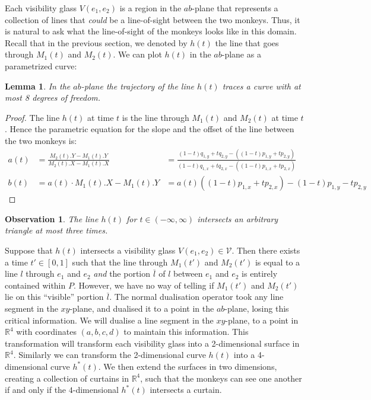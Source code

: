 \documentclass{article}
\newtheorem{observation}{Observation}
\newtheorem{lemma}{Lemma}
\begin{document}
Each visibility glass $V(e_1, e_2)$ is a region in the $ab$-plane that represents a collection of lines that \emph{could} be a line-of-sight between the two monkeys. Thus, it is natural to ask what the line-of-sight of the monkeys looks like in this domain. Recall that in the previous section, we denoted by $h(t)$ the line that goes through $M_1(t)$ and $M_2(t)$. We can plot $h(t)$ in the $ab$-plane as a parametrized curve:

\begin{lemma}
In the $ab$-plane the trajectory of the line $h(t)$ traces a curve with at most 8 degrees of freedom.
\end{lemma}

\begin{proof}
  The line $h(t)$ at time $t$ is the line through $M_1(t)$ and $M_2(t)$ at time $t$. Hence the parametric equation for the slope and the offset of the line between the two monkeys is:
  \begin{align*}
      a(t) &= \frac{M_2(t).Y - M_1(t).Y}{M_2(t).X - M_1(t).X} &= \frac{ (1-t)q_{1,y} + t q_{2,y} - ((1-t)p_{1,y} + t p_{2,y} ) }
      {(1-t)q_{1,x} + t q_{2,x} - ((1-t)p_{1,x} + t p_{2,x} )} \\
      b(t) &= a(t)\cdot M_1(t).X - M_1(t).Y &= a(t)((1-t)p_{1,x} + t p_{2,x}) - (1-t)p_{1,y} - t p_{2,y} 
  \end{align*}
\end{proof}

\begin{observation}
\label{observation:intersection}
  The line $h(t)$ for $t \in (-\infty, \infty)$ intersects an arbitrary triangle at most three times.
\end{observation}

Suppose that $h(t)$ intersects a visibility glass $V(e_1, e_2) \in \mathcal{V}$. Then there exists a time $t' \in [0, 1]$ such that the line through $M_1(t')$ and $M_2(t')$ is equal to a line $l$ through $e_1$ and $e_2$ \emph{and} the portion $\overline{l}$ of $l$ between $e_1$ and $e_2$ is entirely contained within $P$. However, we have no way of telling if $M_1(t')$ and $M_2(t')$ lie on this ``visible'' portion $\overline{l}$. The normal dualisation operator took any line segment in the $xy$-plane, and dualised it to a point in the $ab$-plane, losing this critical information. We will dualise a line segment in the $xy$-plane, to a point in $\mathbb{R}^4$ with coordinates $(a,b,c, d)$ to maintain this information. This transformation will transform each visibility glass into a 2-dimensional surface in $\mathbb{R}^4$. Similarly we can transform the 2-dimensional curve $h(t)$ into a 4-dimensional curve $h^*(t)$. We then extend the surfaces in two dimensions, creating a collection of curtains in $\mathbb{R}^4$, such that the monkeys can see one another if and only if the $4$-dimensional $h^*(t)$ intersects a curtain.
\end{document}

